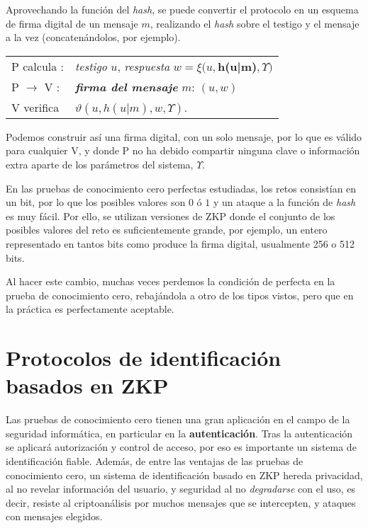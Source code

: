 Aprovechando la función del \textit{hash}, se puede convertir el protocolo en un esquema de firma digital de un mensaje $m$, realizando el \textit{hash} sobre el testigo y el mensaje a la vez (concatenándolos, por ejemplo).


\begin{center}
	\begin{tabular}{ll}
		P calcula :& \textit{testigo} $u$, \textit{respuesta} $w = \xi(u, $\textbf{h(u|m)}$,\Upsilon)$
		\\
		P $\rightarrow$ V :& \textit{\textbf{firma del mensaje}} $m$: \quad $(u,w)$
		\\
		V verifica & $\vartheta(u,h(u|m),w,\Upsilon)$.
	\end{tabular}
\end{center}

Podemos construir así una firma digital, con un solo mensaje, por lo que es válido para cualquier V, y donde P no ha debido compartir ninguna clave o información extra aparte de los parámetros del sistema, $\Upsilon$.

\hfil


\begin{remark}
	\hfil
	
	En las pruebas de conocimiento cero perfectas estudiadas, los retos consistían en un bit, por lo que los posibles valores son $0$ ó $1$ y un ataque a la función de \textit{hash} es muy fácil. Por ello, se utilizan versiones de ZKP donde el conjunto de los posibles valores del reto es suficientemente grande, por ejemplo, un entero representado en tantos bits como produce la firma digital, usualmente 256 o 512 bits.
	
	Al hacer este cambio, muchas veces perdemos la condición de perfecta en la prueba de conocimiento cero, rebajándola a otro de los tipos vistos, pero que en la práctica es perfectamente aceptable.
	
\end{remark}








\section{Protocolos de identificación basados en ZKP}


Las pruebas de conocimiento cero tienen una gran aplicación en el campo de la seguridad informática, en particular en la \textbf{autenticación}. Tras la autenticación se aplicará autorización y control de acceso, por eso es importante un sistema de identificación fiable. Además, de entre las ventajas de las pruebas de conocimiento cero, un sistema de identificación basado en ZKP hereda privacidad, al no revelar información del usuario, y seguridad al no \textit{degradarse} con el uso, es decir, resiste al criptoanálisis por muchos mensajes que se intercepten, y ataques con mensajes elegidos. 

